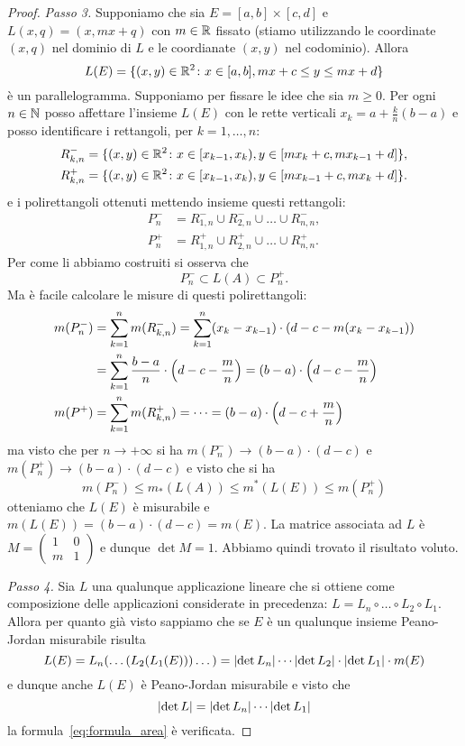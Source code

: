 \begin{proof}
\emph{Passo 3.}
Supponiamo che sia $E=[a,b]\times[c,d]$ e $L(x,q)=(x,mx+q)$
con $m\in \mathbb R$ fissato
(stiamo utilizzando le coordinate $(x,q)$ nel dominio di $L$
e le coordianate $(x,y)$ nel codominio).
Allora
\[
  L(E) = \{(x,y)\in \mathbb R^2\colon x\in[a,b], mx+c \le y \le mx+d\}
\]
è un parallelogramma. Supponiamo per fissare le idee che sia $m\ge 0$.
Per ogni $n\in \mathbb N$ posso affettare l'insieme
$L(E)$ con le rette verticali $x_k = a+\frac{k}{n}(b-a)$ e posso
identificare i rettangoli, per $k=1,\dots, n$:
\begin{align*}
   R_{k,n}^-
   &= \{(x,y)\in \mathbb R^2 \colon x\in [x_{k-1},x_k), y\in[m x_k+c,m x_{k-1}+d]\},
   \\
   R_{k,n}^+
   &= \{(x,y)\in \mathbb R^2 \colon x\in [x_{k-1},x_k), y\in[m x_{k-1}+c,m x_k+d]\}.
\end{align*}
e i polirettangoli ottenuti mettendo insieme questi rettangoli:
\begin{align*}
  P^-_n &= R_{1,n}^- \cup R_{2,n}^- \cup \dots \cup R_{n,n}^-, \\
  P^+_n & = R_{1,n}^+ \cup R_{2,n}^+ \cup \dots \cup R_{n,n}^+.
\end{align*}
Per come li abbiamo costruiti si osserva che
\[
  P^-_n \subset L(A) \subset P^+_n.
\]
Ma è facile calcolare le misure di questi polirettangoli:
\begin{align*}
  m(P^-_n) &= \sum_{k=1}^n m(R_{k,n}^-)
          = \sum_{k=1}^n(x_k-x_{k-1})\cdot (d-c-m(x_k-x_{k-1}))\\
         &= \sum_{k=1}^n \frac {b-a} n \cdot {\left( d-c-\frac{m}{n} \right)}
          = (b-a)\cdot {\left( d-c-\frac{m}{n} \right)} \\
  m(P^+) &= \sum_{k=1}^n m(R_{k,n}^+) = \dots = (b-a)\cdot {\left( d-c+\frac{m}{n} \right)}
\end{align*}
ma visto che per $n\to +\infty$ si ha $m(P^-_n)\to (b-a)\cdot(d-c)$
e $m(P^+_n) \to (b-a)\cdot(d-c)$ e visto che si ha
\[
  m(P^-_n)\le m_*(L(A))\le m^*(L(E)) \le m(P^+_n)
\]
otteniamo che $L(E)$ è misurabile e $m(L(E)) = (b-a)\cdot(d-c) = m(E)$.
La matrice associata ad $L$ è $M=\begin{pmatrix}1 & 0 \\ m & 1 \end{pmatrix}$
e dunque $\det M = 1$. Abbiamo quindi trovato il risultato voluto.

\emph{Passo 4.}
Sia $L$ una qualunque applicazione lineare che si ottiene come
composizione delle applicazioni considerate in precedenza: 
$L= L_n\circ \dots  \circ L_2 \circ L_1$. 
Allora per quanto già visto sappiamo
che se $E$ è un qualunque insieme Peano-Jordan misurabile risulta
\[
L(E) = L_n(\dots(L_2(L_1(E)))\dots)
     = {\left|\det L_n\right|} \cdots {\left|\det L_2\right|} \cdot {\left|\det L_1\right|} \cdot m(E)
\]
e dunque anche $L(E)$ è Peano-Jordan misurabile e visto che
\[
 {\left|\det L\right|} = {\left|\det L_n\right|} \cdots {\left|\det L_1\right|}
\]
la formula~\eqref{eq:formula_area} è verificata.


\end{proof}
